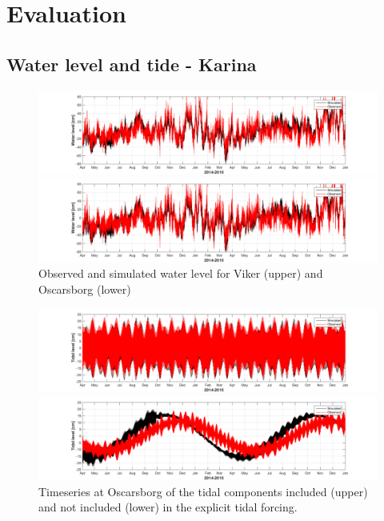 \documentclass[12pt,a4paper,english]{article}
\begin{document}
\clearpage
\section{Evaluation}
\subsection{Water level and tide - Karina}

\begin{figure}[t]
\centerline{
\includegraphics*[trim=3cm 0cm 2.5cm 0cm,clip=true,width=\textwidth]{Figurer/Viker_WL} 
}
\centerline{
\includegraphics*[trim=3cm 0cm 2.5cm 0cm,clip=true,width=\textwidth]{Figurer/Oscarsborg_WL}
}
\caption{\small
Observed and simulated water level for Viker (upper) and Oscarsborg (lower)}
\label{fig:Waterlevel}
\end{figure}


\begin{figure}[t]
\centerline{
\includegraphics*[trim=3cm 0cm 2.5cm 0cm,clip=true,width=\textwidth]{Figurer/Oscarsborg_Tide_selected}
}
\centerline{
\includegraphics*[trim=3cm 0cm 2.5cm 0cm,clip=true,width=\textwidth]{Figurer/Oscarsborg_Tide_NorKyst800} 
}
\caption{\small
Timeseries at Oscarsborg of the tidal components included (upper) and not included (lower) in the explicit tidal forcing.}
\label{fig:Waterlevel_tide}
\end{figure}
\end{document}
